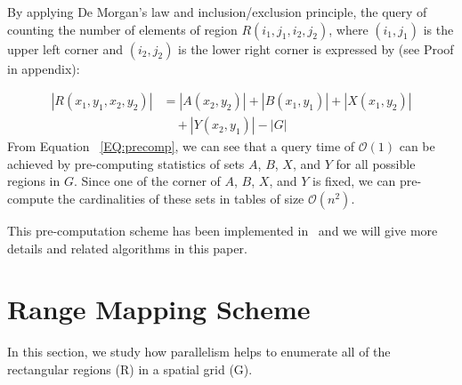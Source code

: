 \documentclass[10pt,journal,cspaper,compsoc]{IEEEtran}
\newcommand\bigo{\mathcal O}
\begin{document}
 By applying De Morgan's law and inclusion/exclusion principle, the query of counting the number of elements of region $R(i_1,j_1,i_2,j_2)$, where $(i_1,j_1)$ is the upper left corner and $(i_2,j_2)$ is the lower right corner is expressed by (see Proof in appendix):

\small
\begin{equation}
\label{EQ:precomp}
\begin{split}
|R(x_1,y_1,x_2,y_2)|& = |A(x_2,y_2)| + |B(x_1,y_1)| + |X(x_1,y_2)| \\& \quad + |Y(x_2,y_1)| - |G|
\end{split}
\end{equation}
\normalsize
From Equation ~\ref{EQ:precomp}, we can see that a query time of $\bigo(1)$ can be achieved by pre-computing statistics of sets $A$, $B$, $X$, and $Y$ for all possible regions in $G$. Since one of the corner of $A$, $B$, $X$, and $Y$ is fixed, we can pre-compute the cardinalities of these sets in tables of size $\bigo(n^2)$.

This pre-computation scheme has been implemented in~\cite{apweb} and we will give more details and related algorithms in this paper.

\section {Range Mapping Scheme} \label{RMS}
In this section, we study how parallelism helps to enumerate all of the rectangular regions (R) in a spatial grid (G).
\end{document}
